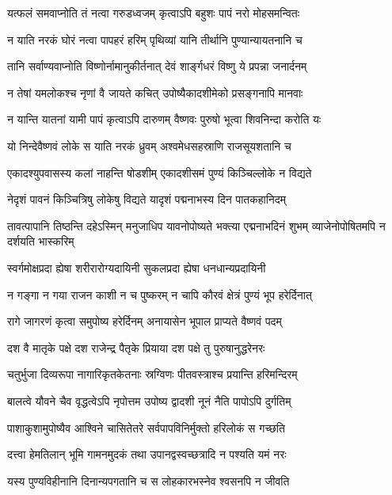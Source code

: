\twolineshloka
{यत्फलं समवाप्नोति तं नत्वा गरुडध्वजम्}
{कृत्वाऽपि बहुशः पापं नरो मोहसमन्वितः} %

\twolineshloka
{न याति नरकं घोरं नत्वा पापहरं हरिम्}
{पृथिव्यां यानि तीर्थानि पुण्यान्यायतनानि च} %

\twolineshloka
{तानि सर्वाण्यवाप्नोति विष्णोर्नामानुकीर्तनात्}
{देवं शार्ङ्गधरं विष्णु ये प्रपन्ना जनार्दनम्} %

\twolineshloka
{न तेषां यमलोकश्च नृणां वै जायते कचित्}
{उपोष्यैकादशीमेको प्रसङ्गनापि मानवाः} %

\twolineshloka
{न यान्ति यातनां यामी पापं कृत्वाऽपि दारुणम्}
{वैष्णवः पुरुषो भूत्वा शिवनिन्दा करोति यः} %

\twolineshloka
{यो निन्देवैष्णवं लोके स याति नरकं ध्रुवम्}
{अश्वमेधसहस्राणि राजसूयशतानि च} %

\twolineshloka
{एकादश्युपवासस्य कलां नाहन्ति षोडशीम्}
{एकादशीसमं पुण्यं किञ्चिल्लोके न विद्यते} %

\twolineshloka
{नेदृशं पावनं किञ्चित्रिषु लोकेषु विद्यते}
{यादृशं पद्मनाभस्य दिन पातकहानिदम्} %


\threelineshloka
{तावत्पापानि तिष्ठन्ति दहेऽस्मिन् मनुजाधिप}
{यावनोपोष्यते भक्त्या एद्मनाभदिनं शुभम्}
{व्याजेनोपोषितमपि न दर्शयति भास्करिम्} %

\twolineshloka
{स्वर्गमोक्षप्रदा ह्येषा शरीरारोग्यदायिनी}
{सुकलप्रदा ह्येषा धनधान्यप्रदायिनी} %

\twolineshloka
{न गङ्गा न गया राजन काशी न च पुष्करम्}
{न चापि कौरवं क्षेत्रं पुण्यं भूप हरेर्दिनात्} %

\twolineshloka
{रागे जागरणं कृत्वा समुपोष्य हरेर्दिनम्}
{अनायासेन भूपाल प्राप्यते वैष्णवं पदम्} %

\twolineshloka
{दश वै मातृके पक्षे दश राजेन्द्र पैतृके}
{प्रियाया दश पक्षे तु पुरुषानुद्धरेनरः} %

\twolineshloka
{चतुर्भुजा दिव्यरूपा नागारिकृतकेतनाः}
{स्रग्विणः पीतवस्त्राश्च प्रयान्ति हरिमन्दिरम्} %

\twolineshloka
{बालत्वे यौवने चैव वृद्धत्वेऽपि नृपोत्तम}
{उपोष्य द्वादशी नूनं नैति पापोऽपि दुर्गतिम्} %

\twolineshloka
{पाशाकुशामुपोष्यैव आश्विने चासितेतरे}
{सर्वपापविनिर्मुक्तो हरिलोकं स गच्छति} %

\twolineshloka
{दत्त्वा हेमतिलान् भूमि गामनमुदकं तथा}
{उपानद्वस्वच्छत्रादि न पश्यति यमं नरः} %

\twolineshloka
{यस्य पुण्यविहीनानि दिनान्यपगतानि च}
{स लोहकारभस्नेव श्वसनपि न जीवति} %

